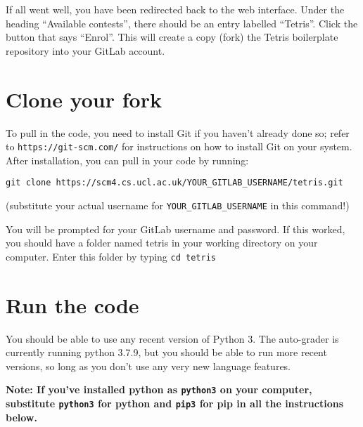 \documentclass{article}
\begin{document}
If all went well, you have been redirected back to the web
interface. Under the heading “Available contests”, there should be an
entry labelled “Tetris”. Click the button that says “Enrol”. This will
create a copy (fork) the Tetris boilerplate repository into your
GitLab account.

\section{Clone your fork}
  
To pull in the code, you need to install Git if you haven't already done so;
refer to  \texttt{https://git-scm.com/} for instructions on how to install Git on your
system. After installation, you can pull in your code by running:
\begin{verbatim}
git clone https://scm4.cs.ucl.ac.uk/YOUR_GITLAB_USERNAME/tetris.git
\end{verbatim}

\noindent(substitute your actual username for \texttt{YOUR\_GITLAB\_USERNAME} in this command!)

You will be prompted for your GitLab username and password. If this
worked, you should have a folder named tetris in your working
directory on your computer. Enter this folder by typing \texttt{cd tetris}

\section{Run the code}
  
You should be able to use any recent version of Python 3. The auto-grader is
currently running python 3.7.9, but you should be able to run more
recent versions, so long as you don't use any very new language features.

\textbf{Note: If you've installed python as \texttt{python3} on your computer, substitute \texttt{python3} for python and \texttt{pip3} for pip in all the instructions below.}
\end{document}
